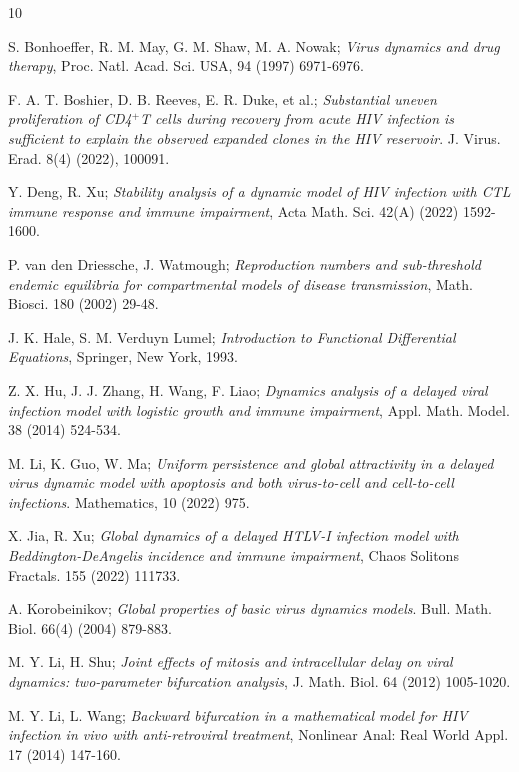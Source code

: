 \documentclass[reqno]{amsart}
\begin{document}
\begin{thebibliography}{10}

 S. Bonhoeffer, R. M. May, G. M. Shaw, M. A. Nowak;
\emph{Virus dynamics and drug therapy}, Proc. Natl. Acad. Sci. USA, 94 (1997) 6971-6976.

  F. A. T. Boshier, D. B. Reeves, E. R. Duke,  et al.;
\emph{Substantial uneven proliferation of CD4$^+$T cells during recovery from acute 
HIV infection is sufficient to explain the observed expanded clones in the HIV reservoir}.
J. Virus. Erad. 8(4) (2022), 100091.

 Y. Deng, R. Xu;
\emph{Stability analysis of a dynamic model of HIV infection with CTL immune response 
and immune impairment},
Acta Math. Sci. 42(A) (2022) 1592-1600.

 P. van den Driessche, J. Watmough;
\emph{Reproduction numbers and sub-threshold endemic equilibria for compartmental 
models of disease transmission}, Math. Biosci. 180 (2002) 29-48.

 J. K. Hale, S. M. Verduyn Lumel;
\emph{Introduction to Functional Differential Equations}, Springer, New York, 1993.

 Z. X. Hu, J. J. Zhang, H. Wang, F. Liao;
\emph{Dynamics analysis of a delayed viral infection model with logistic growth 
and immune impairment}, Appl. Math. Model. 38 (2014) 524-534.

 M. Li, K. Guo, W. Ma;
\emph{Uniform persistence and global attractivity in a delayed virus dynamic
model with apoptosis and both virus-to-cell and cell-to-cell infections}. 
 Mathematics,  10 (2022) 975.

 X. Jia, R. Xu;
\emph{Global dynamics of a delayed HTLV-I infection model with Beddington-DeAngelis
 incidence and immune impairment}, Chaos Solitons Fractals. 155 (2022) 111733.

 A. Korobeinikov;
\emph{Global properties of basic virus dynamics models}. 
Bull. Math. Biol. 66(4) (2004)  879-883.

 M. Y. Li, H. Shu;
\emph{Joint effects of mitosis and intracellular delay on viral dynamics:
two-parameter bifurcation analysis}, J. Math. Biol. 64 (2012) 1005-1020.

 M. Y. Li, L. Wang;
\emph{Backward bifurcation in a mathematical model for HIV infection in 
vivo with anti-retroviral treatment}, Nonlinear Anal: Real World Appl.
17 (2014) 147-160.


\end{thebibliography}
\end{document}
